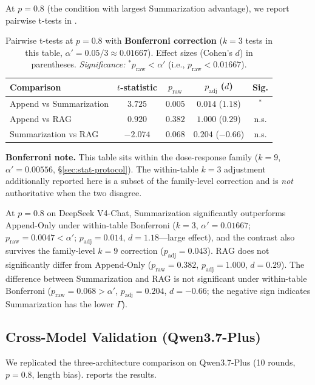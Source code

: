 \documentclass[11pt]{article}
\begin{document}
At $p=0.8$ (the condition with largest Summarization advantage), we report pairwise t-tests in .

\begin{table}[htbp]
\centering
\caption{Pairwise t-tests at $p=0.8$ with \textbf{Bonferroni correction} ($k=3$ tests in this table, $\alpha' = 0.05/3 \approx 0.01667$). Effect sizes (Cohen's $d$) in parentheses. \emph{Significance:} $^{*}p_{\text{raw}} < \alpha'$ (i.e., $p_{\text{raw}} < 0.01667$).}
\label{tab:stats}
\begin{tabular}{lcccc}
\toprule
Comparison & $t$-statistic & $p_{\text{raw}}$ & $p_{\text{adj}}$ ($d$) & Sig. \\
\midrule
Append vs Summarization & $3.725$ & $0.005$ & $0.014$ ($1.18$) & $^{*}$ \\
Append vs RAG & $0.920$ & $0.382$ & $1.000$ ($0.29$) & n.s. \\
Summarization vs RAG & $-2.074$ & $0.068$ & $0.204$ ($-0.66$) & n.s. \\
\bottomrule
\end{tabular}
\par\smallskip
{\small\textbf{Bonferroni note.} This table sits within the dose-response family ($k=9$, $\alpha' = 0.00556$, \S\ref{sec:stat-protocol}). The within-table $k=3$ adjustment additionally reported here is a subset of the family-level correction and is \emph{not} authoritative when the two disagree.}
\end{table}

At $p=0.8$ on DeepSeek V4-Chat, Summarization significantly outperforms Append-Only under within-table Bonferroni ($k=3$, $\alpha'=0.01667$; $p_{\text{raw}}=0.0047 < \alpha'$; $p_{\text{adj}}=0.014$, $d=1.18$---large effect), and the contrast also survives the family-level $k{=}9$ correction ($p_{\text{adj}}=0.043$). RAG does not significantly differ from Append-Only ($p_{\text{raw}}=0.382$, $p_{\text{adj}}=1.000$, $d=0.29$). The difference between Summarization and RAG is not significant under within-table Bonferroni ($p_{\text{raw}}=0.068 > \alpha'$, $p_{\text{adj}}=0.204$, $d=-0.66$; the negative sign indicates Summarization has the lower $\Gamma$).

\subsection{Cross-Model Validation (Qwen3.7-Plus)}

We replicated the three-architecture comparison on Qwen3.7-Plus (10 rounds, $p=0.8$, length bias).  reports the results.
\end{document}
